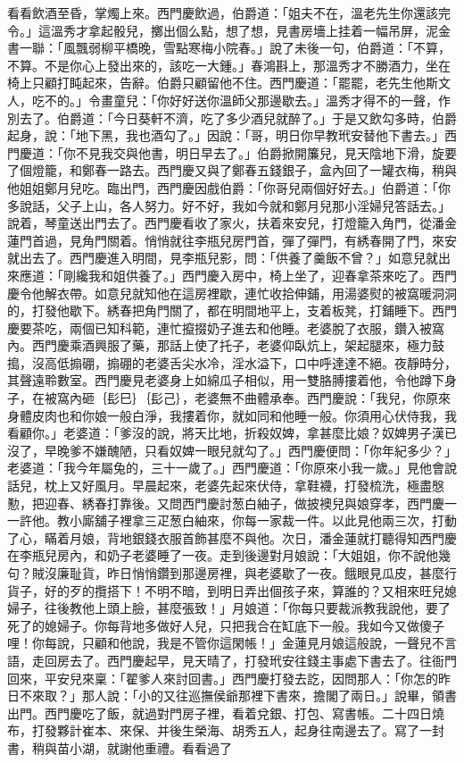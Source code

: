 看看飲酒至昏，掌燭上來。西門慶飲過，伯爵道：「姐夫不在，溫老先生你還該完令。」這溫秀才拿起骰兒，擲出個么點，想了想，見書房墻上挂着一幅吊屏，泥金書一聯：「風飄弱柳平橋晚，雪點寒梅小院春。」說了未後一句，伯爵道：「不算，不算。不是你心上發出來的，該吃一大鍾。」春鴻斟上，那溫秀才不勝酒力，坐在椅上只顧打盹起來，告辭。伯爵只顧留他不住。西門慶道：「罷罷，老先生他斯文人，吃不的。」令畫童兒：「你好好送你溫師父那邊歇去。」溫秀才得不的一聲，作別去了。伯爵道：「今日葵軒不濟，吃了多少酒兒就醉了。」于是又飲勾多時，伯爵起身，說：「地下黑，我也酒勾了。」因說：「哥，明日你早教玳安替他下書去。」西門慶道：「你不見我交與他書，明日早去了。」伯爵掀開簾兒，見天陰地下滑，旋要了個燈籠，和鄭春一路去。西門慶又與了鄭春五錢銀子，盒內回了一罐衣梅，稍與他姐姐鄭月兒吃。臨出門，西門慶因戲伯爵：「你哥兒兩個好好去。」伯爵道：「你多說話，父子上山，各人努力。好不好，我如今就和鄭月兒那小淫婦兒答話去。」說着，琴童送出門去了。西門慶看收了家火，扶着來安兒，打燈籠入角門，從潘金蓮門首過，見角門關着。悄悄就往李瓶兒房門首，彈了彈門，有綉春開了門，來安就出去了。西門慶進入明間，見李瓶兒影，問：「供養了羹飯不曾？」如意兒就出來應道：「剛纔我和姐供養了。」西門慶入房中，椅上坐了，迎春拿茶來吃了。西門慶令他解衣帶。如意兒就知他在這房裡歇，連忙收拾伸鋪，用湯婆熨的被窩暖洞洞的，打發他歇下。綉春把角門關了，都在明間地平上，支着板凳，打鋪睡下。西門慶要茶吃，兩個已知科範，連忙攛掇奶子進去和他睡。老婆脫了衣服，鑽入被窩內。西門慶乘酒興服了藥，那話上使了托子，老婆仰臥炕上，架起腿來，極力鼓搗，沒高低搧硼，搧硼的老婆舌尖水冷，淫水溢下，口中呼達達不絕。夜靜時分，其聲遠聆數室。西門慶見老婆身上如綿瓜子相似，用一雙胳膊摟着他，令他蹲下身子，在被窩內砸｛髟巳｝｛髟己｝，老婆無不曲體承奉。西門慶說：「我兒，你原來身體皮肉也和你娘一般白淨，我摟着你，就如同和他睡一般。你須用心伏侍我，我看顧你。」老婆道：「爹沒的說，將天比地，折殺奴婢，拿甚麼比娘？奴婢男子漢已沒了，早晚爹不嫌醜陋，只看奴婢一眼兒就勾了。」西門慶便問：「你年紀多少？」老婆道：「我今年屬兔的，三十一歲了。」西門慶道：「你原來小我一歲。」見他會說話兒，枕上又好風月。早晨起來，老婆先起來伏侍，拿鞋襪，打發梳洗，極盡慇懃，把迎春、綉春打靠後。又問西門慶討葱白紬子，做披襖兒與娘穿孝，西門慶一一許他。教小廝舖子裡拿三疋葱白紬來，你每一家裁一件。以此見他兩三次，打動了心，瞞着月娘，背地銀錢衣服首飾甚麼不與他。次日，潘金蓮就打聽得知西門慶在李瓶兒房內，和奶子老婆睡了一夜。走到後邊對月娘說：「大姐姐，你不說他幾句？賊沒廉耻貨，昨日悄悄鑽到那邊房裡，與老婆歇了一夜。餓眼見瓜皮，甚麼行貨子，好的歹的攬搭下！不明不暗，到明日弄出個孩子來，算誰的？又相來旺兒媳婦子，往後教他上頭上臉，甚麼張致！」月娘道：「你每只要裁派教我說他，要了死了的媳婦子。你每背地多做好人兒，只把我合在缸底下一般。我如今又做傻子哩！你每說，只顧和他說，我是不管你這閑帳！」金蓮見月娘這般說，一聲兒不言語，走回房去了。西門慶起早，見天晴了，打發玳安往錢主事處下書去了。往衙門回來，平安兒來稟：「翟爹人來討回書。」西門慶打發去訖，因問那人：「你怎的昨日不來取？」那人說：「小的又往巡撫侯爺那裡下書來，擔閣了兩日。」說畢，領書出門。西門慶吃了飯，就過對門房子裡，看着兌銀、打包、寫書帳。二十四日燒布，打發夥計崔本、來保、并後生榮海、胡秀五人，起身往南邊去了。寫了一封書，稍與苗小湖，就謝他重禮。看看過了